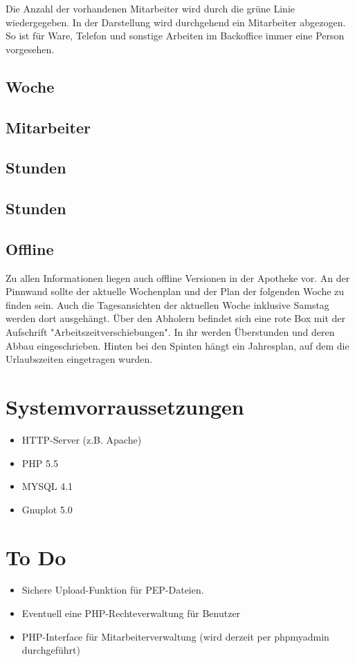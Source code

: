 \documentclass[10pt,a4paper,titlepage,oneside]{article}
\begin{document}
Die Anzahl der vorhandenen Mitarbeiter wird durch die grüne Linie wiedergegeben. In der Darstellung wird durchgehend ein Mitarbeiter abgezogen. So ist für Ware, Telefon und sonstige Arbeiten im Backoffice immer eine Person vorgesehen.
\subsection{Woche}
\subsection{Mitarbeiter}
\subsection{Stunden}
\subsection{Stunden}
\subsection{Offline}
Zu allen Informationen liegen auch offline Versionen in der Apotheke vor.
An der Pinnwand sollte der aktuelle Wochenplan und der Plan der folgenden Woche zu finden sein. Auch die Tagesansichten der aktuellen Woche inklusive Samstag werden dort ausgehängt. Über den Abholern befindet sich eine rote Box mit der Aufschrift "Arbeitszeitverschiebungen". In ihr werden Überstunden und deren Abbau eingeschrieben.
Hinten bei den Spinten hängt ein Jahresplan, auf dem die Urlaubszeiten eingetragen wurden.


\section{Systemvorraussetzungen}
	\begin{itemize}
		\item HTTP-Server (z.B. Apache)
		\item PHP 5.5
		\item MYSQL 4.1
		\item Gnuplot 5.0
	\end{itemize}


\section{To Do}
\begin{itemize}
	\item Sichere Upload-Funktion für PEP-Dateien.
	\item Eventuell eine PHP-Rechteverwaltung für Benutzer
	\item PHP-Interface für Mitarbeiterverwaltung (wird derzeit per phpmyadmin durchgeführt)
\end{itemize}
\end{document}
